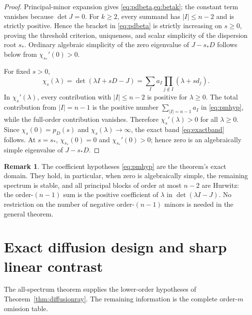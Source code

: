 \documentclass[11pt]{article}
\theoremstyle{definition}
\newtheorem{remark}[theorem]{Remark}
\newcommand{\1}{\mathbf 1}
\begin{document}
\begin{proof}
Principal-minor expansion gives \cref{eq:pdbeta,eq:betak}; the constant term
vanishes because $\det J=0$.  For $k\ge2$, every summand has
$|I|\le n-2$ and is strictly positive.  Hence the bracket in
\eqref{eq:pdbeta} is strictly increasing on $s\ge0$, proving the threshold
criterion, uniqueness, and scalar simplicity of the dispersion root $s_*$.  Ordinary
algebraic simplicity of the zero eigenvalue of $J-s_*D$ follows below from
$\chi_{s_*}'(0)>0$.

For fixed $s>0$,
\begin{equation}\label{eq:chis}
 \chi_s(\lambda)=\det(\lambda I+sD-J)
 =\sum_Ia_I\prod_{j\notin I}(\lambda+sd_j).
\end{equation}
In $\chi_s'(\lambda)$, every contribution with $|I|\le n-2$ is positive for
$\lambda\ge0$.  The total contribution from $|I|=n-1$ is the positive number
$\sum_{|I|=n-1}a_I$ in \eqref{eq:pmhyp}, while the full-order contribution
vanishes.  Therefore $\chi_s'(\lambda)>0$ for all $\lambda\ge0$.  Since
$\chi_s(0)=p_D(s)$ and $\chi_s(\lambda)\to\infty$, the exact band
\eqref{eq:exactband} follows.  At $s=s_*$,
$\chi_{s_*}(0)=0$ and $\chi_{s_*}'(0)>0$; hence zero is an algebraically
simple eigenvalue of $J-s_*D$.
\end{proof}

\begin{remark}\label{rem:spectralhyp}
The coefficient hypotheses \eqref{eq:pmhyp} are the theorem's exact domain.
They hold, in particular, when zero is algebraically simple, the remaining
spectrum is stable, and all principal blocks of order at most $n-2$ are
Hurwitz: the order-$(n-1)$ sum is the positive coefficient of $\lambda$ in
$\det(\lambda I-J)$.  No restriction on the number of negative
order-$(n-1)$ minors is needed in the general theorem.
\end{remark}

\section{Exact diffusion design and sharp linear contrast}

The all-spectrum theorem supplies the lower-order hypotheses of
Theorem~\ref{thm:diffusionray}.  The remaining information is the complete order-$m$
omission table.
\end{document}
